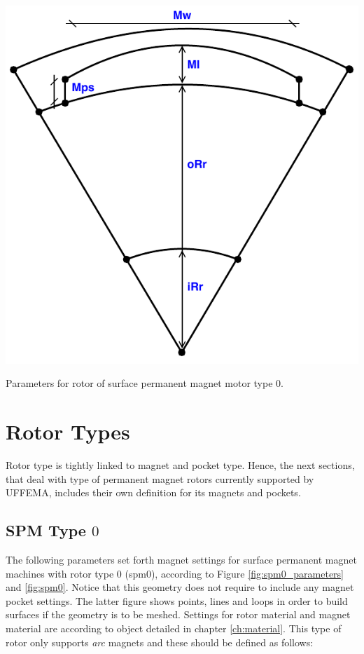 \documentclass[justified]{tufte-book} %
\begin{document}
\begin{marginfigure}
\includegraphics[width=\linewidth]{SPM_0_parameters.pdf}
\caption{Parameters for rotor of surface permanent magnet motor type $0$.}
\label{fig:spm0_parameters}
\end{marginfigure}

\section{Rotor Types}
Rotor type is tightly linked to magnet and pocket type. Hence, the next sections, that deal with type of permanent magnet rotors currently supported by UFFEMA, includes their own definition for its magnets and pockets.
\subsection{SPM Type $0$}
The following parameters set forth magnet settings for surface permanent magnet machines with rotor type $0$ (spm$0$), according to Figure \ref{fig:spm0_parameters} and \ref{fig:spm0}. Notice that this geometry does not require to include any magnet pocket settings. The latter figure shows points, lines and loops in order to build surfaces if the geometry is to be meshed. Settings for rotor material and magnet material are according to object detailed in chapter \ref{ch:material}. This type of rotor only supports \textit{arc} magnets and these should be defined as follows:
\end{document}
